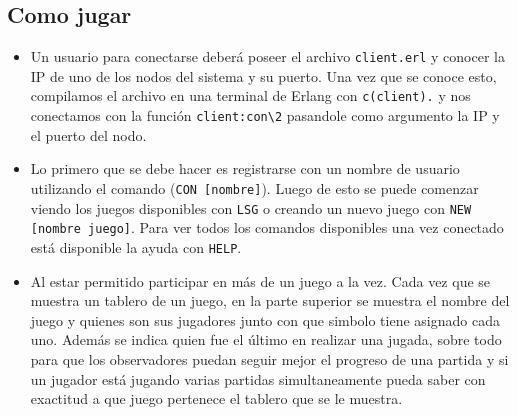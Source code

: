 \documentclass[a4paper]{article}
\newcommand{\blacktr}[0]{\item[$\blacktriangleright$]}
\begin{document}
\subsection*{Como jugar}
\begin{itemize}
   \blacktr Un usuario para conectarse deberá poseer el archivo \texttt{client.erl} y conocer la IP de uno de los nodos del sistema y su puerto. Una vez que se conoce esto, compilamos el archivo en una terminal de Erlang con \texttt{c(client).} y nos conectamos con la función \texttt{client:con\textbackslash2} pasandole como argumento la IP y el puerto del nodo. 
  
  \blacktr Lo primero que se debe hacer es registrarse con un nombre de usuario utilizando el comando (\texttt{CON [nombre]}). Luego de esto se puede comenzar viendo los juegos disponibles con \texttt{LSG} o creando un nuevo juego con \texttt{NEW [nombre juego]}. Para ver todos los comandos disponibles una vez conectado está disponible la ayuda con \texttt{HELP}.

  \blacktr Al estar permitido participar en más de un juego a la vez. Cada vez que se muestra un tablero de un juego, en la parte superior se muestra el nombre del juego y quienes son sus jugadores junto con que simbolo tiene asignado cada uno. Además se indica quien fue el último en realizar una jugada, sobre todo para que los observadores puedan seguir mejor el progreso de una partida y si un jugador está jugando varias partidas simultaneamente pueda saber con exactitud a que juego pertenece el tablero que se le muestra.
\end{itemize}
\end{document}

